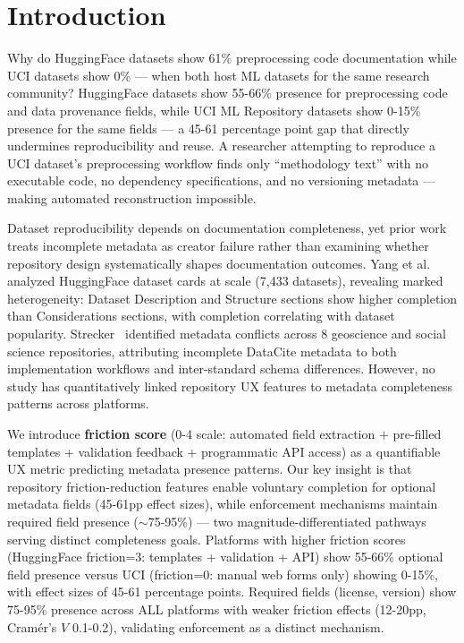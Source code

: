 \section{Introduction}

Why do HuggingFace datasets show 61\% preprocessing code documentation while UCI datasets show 0\% --- when both host ML datasets for the same research community? HuggingFace datasets show 55-66\% presence for preprocessing code and data provenance fields, while UCI ML Repository datasets show 0-15\% presence for the same fields --- a 45-61 percentage point gap that directly undermines reproducibility and reuse. A researcher attempting to reproduce a UCI dataset's preprocessing workflow finds only ``methodology text'' with no executable code, no dependency specifications, and no versioning metadata --- making automated reconstruction impossible.

Dataset reproducibility depends on documentation completeness, yet prior work treats incomplete metadata as creator failure rather than examining whether repository design systematically shapes documentation outcomes. Yang et al.~\cite{yang2024dataset} analyzed HuggingFace dataset cards at scale (7,433 datasets), revealing marked heterogeneity: Dataset Description and Structure sections show higher completion than Considerations sections, with completion correlating with dataset popularity. Strecker~\cite{strecker2026metadata} identified metadata conflicts across 8 geoscience and social science repositories, attributing incomplete DataCite metadata to both implementation workflows and inter-standard schema differences. However, no study has quantitatively linked repository UX features to metadata completeness patterns across platforms.

We introduce \textbf{friction score} (0-4 scale: automated field extraction + pre-filled templates + validation feedback + programmatic API access) as a quantifiable UX metric predicting metadata presence patterns. Our key insight is that repository friction-reduction features enable voluntary completion for optional metadata fields (45-61pp effect sizes), while enforcement mechanisms maintain required field presence ($\sim$75-95\%) --- two magnitude-differentiated pathways serving distinct completeness goals. Platforms with higher friction scores (HuggingFace friction=3: templates + validation + API) show 55-66\% optional field presence versus UCI (friction=0: manual web forms only) showing 0-15\%, with effect sizes of 45-61 percentage points. Required fields (license, version) show 75-95\% presence across ALL platforms with weaker friction effects (12-20pp, Cramér's $V$ 0.1-0.2), validating enforcement as a distinct mechanism.


